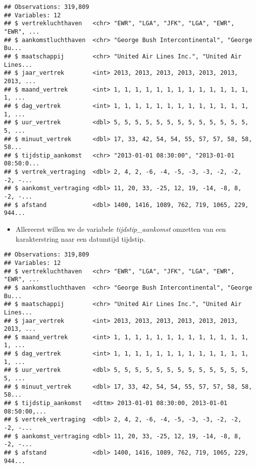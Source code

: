 \documentclass[]{memoir}
\newenvironment{Shaded}{\begin{snugshade}}{\end{snugshade}}
\newcommand{\DataTypeTok}[1]{\textcolor[rgb]{0.13,0.29,0.53}{#1}}
\newcommand{\KeywordTok}[1]{\textcolor[rgb]{0.13,0.29,0.53}{\textbf{#1}}}
\newcommand{\NormalTok}[1]{#1}
\newcommand{\OperatorTok}[1]{\textcolor[rgb]{0.81,0.36,0.00}{\textbf{#1}}}
\newcommand{\StringTok}[1]{\textcolor[rgb]{0.31,0.60,0.02}{#1}}
\providecommand{\tightlist}{%
  \setlength{\itemsep}{0pt}\setlength{\parskip}{0pt}}
\begin{document}
\begin{verbatim}
## Observations: 319,809
## Variables: 12
## $ vertrekluchthaven   <chr> "EWR", "LGA", "JFK", "LGA", "EWR", "EWR", ...
## $ aankomstluchthaven  <chr> "George Bush Intercontinental", "George Bu...
## $ maatschappij        <chr> "United Air Lines Inc.", "United Air Lines...
## $ jaar_vertrek        <int> 2013, 2013, 2013, 2013, 2013, 2013, 2013, ...
## $ maand_vertrek       <int> 1, 1, 1, 1, 1, 1, 1, 1, 1, 1, 1, 1, 1, 1, ...
## $ dag_vertrek         <int> 1, 1, 1, 1, 1, 1, 1, 1, 1, 1, 1, 1, 1, 1, ...
## $ uur_vertrek         <dbl> 5, 5, 5, 5, 5, 5, 5, 5, 5, 5, 5, 5, 5, 5, ...
## $ minuut_vertrek      <dbl> 17, 33, 42, 54, 54, 55, 57, 57, 58, 58, 58...
## $ tijdstip_aankomst   <chr> "2013-01-01 08:30:00", "2013-01-01 08:50:0...
## $ vertrek_vertraging  <dbl> 2, 4, 2, -6, -4, -5, -3, -3, -2, -2, -2, -...
## $ aankomst_vertraging <dbl> 11, 20, 33, -25, 12, 19, -14, -8, 8, -2, -...
## $ afstand             <dbl> 1400, 1416, 1089, 762, 719, 1065, 229, 944...
\end{verbatim}

\begin{itemize}
\tightlist
\item
  Allereerst willen we de variabele \emph{tijdstip\_aankomst} omzetten van een karakterstring naar een datumtijd tijdstip.
\end{itemize}

\begin{Shaded}
\end{Shaded}

\begin{verbatim}
## Observations: 319,809
## Variables: 12
## $ vertrekluchthaven   <chr> "EWR", "LGA", "JFK", "LGA", "EWR", "EWR", ...
## $ aankomstluchthaven  <chr> "George Bush Intercontinental", "George Bu...
## $ maatschappij        <chr> "United Air Lines Inc.", "United Air Lines...
## $ jaar_vertrek        <int> 2013, 2013, 2013, 2013, 2013, 2013, 2013, ...
## $ maand_vertrek       <int> 1, 1, 1, 1, 1, 1, 1, 1, 1, 1, 1, 1, 1, 1, ...
## $ dag_vertrek         <int> 1, 1, 1, 1, 1, 1, 1, 1, 1, 1, 1, 1, 1, 1, ...
## $ uur_vertrek         <dbl> 5, 5, 5, 5, 5, 5, 5, 5, 5, 5, 5, 5, 5, 5, ...
## $ minuut_vertrek      <dbl> 17, 33, 42, 54, 54, 55, 57, 57, 58, 58, 58...
## $ tijdstip_aankomst   <dttm> 2013-01-01 08:30:00, 2013-01-01 08:50:00,...
## $ vertrek_vertraging  <dbl> 2, 4, 2, -6, -4, -5, -3, -3, -2, -2, -2, -...
## $ aankomst_vertraging <dbl> 11, 20, 33, -25, 12, 19, -14, -8, 8, -2, -...
## $ afstand             <dbl> 1400, 1416, 1089, 762, 719, 1065, 229, 944...
\end{verbatim}
\end{document}
